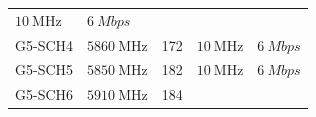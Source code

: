 \documentclass[letterpaper,11pt]{article}
\begin{document}
\begin{onehalfspace}
\begin{longtable}[]{@{}lllll@{}}
\begin{minipage}[t]{0.14\columnwidth}
\(\SI{10}{\mega\hertz}\)\strut
\end{minipage} & \begin{minipage}[t]{0.18\columnwidth}\raggedright\strut
\(\SI{6}{Mbps}\)\strut
\end{minipage}\tabularnewline
\begin{minipage}[t]{0.08\columnwidth}\raggedright\strut
G5-SCH4\strut
\end{minipage} & \begin{minipage}[t]{0.30\columnwidth}\raggedright\strut
\(\SI{5860}{\mega\hertz}\)\strut
\end{minipage} & \begin{minipage}[t]{0.16\columnwidth}\raggedright\strut
172\strut
\end{minipage} & \begin{minipage}[t]{0.14\columnwidth}\raggedright\strut
\(\SI{10}{\mega\hertz}\)\strut
\end{minipage} & \begin{minipage}[t]{0.18\columnwidth}\raggedright\strut
\(\SI{6}{Mbps}\)\strut
\end{minipage}\tabularnewline
\begin{minipage}[t]{0.08\columnwidth}\raggedright\strut
G5-SCH5\strut
\end{minipage} & \begin{minipage}[t]{0.30\columnwidth}\raggedright\strut
\(\SI{5850}{\mega\hertz}\)\strut
\end{minipage} & \begin{minipage}[t]{0.16\columnwidth}\raggedright\strut
182\strut
\end{minipage} & \begin{minipage}[t]{0.14\columnwidth}\raggedright\strut
\(\SI{10}{\mega\hertz}\)\strut
\end{minipage} & \begin{minipage}[t]{0.18\columnwidth}\raggedright\strut
\(\SI{6}{Mbps}\)\strut
\end{minipage}\tabularnewline
\begin{minipage}[t]{0.08\columnwidth}\raggedright\strut
G5-SCH6\strut
\end{minipage} & \begin{minipage}[t]{0.30\columnwidth}\raggedright\strut
\(\SI{5910}{\mega\hertz}\)\strut
\end{minipage} & \begin{minipage}[t]{0.16\columnwidth}\raggedright\strut
184\strut
\end{minipage} & \begin{minipage}[t]{0.14\columnwidth}\raggedright\strut

\end{minipage}
\end{longtable}
\end{onehalfspace}
\end{document}
